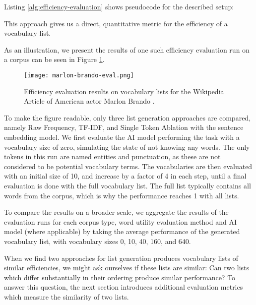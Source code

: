 Listing \ref{alg:efficiency-evaluation} shows pseudocode for the described setup:




This approach gives us a direct, quantitative metric for the efficiency of a vocabulary list.

As an illustration, we present the results of one such efficiency evaluation run on a corpus can be seen in Figure \ref{fig:marlon-brando-eval}.
\begin{figure}[H]
	\centering
	\texttt{[image: marlon-brando-eval.png]}
	\caption{Efficiency evaluation results on vocabulary lists for the Wikipedia Article of American actor Marlon Brando \protect\footnotemark.}
	\label{fig:marlon-brando-eval}
\end{figure}


To make the figure readable, only three list generation approaches are compared, namely Raw Frequency, TF-IDF, and Single Token Ablation with the sentence embedding model.
We first evaluate the AI model performing the task with a vocabulary size of zero, simulating the state of not knowing any words. 
The only tokens in this run are named entities and punctuation, as these are not considered to be potential vocabulary terms.
The vocabularies are then evaluated with an initial size of 10, and increase by a factor of 4 in each step, until a final evaluation is done with the full vocabulary list.
The full list typically contains all words from the corpus, which is why the performance reaches 1 with all lists.

To compare the results on a broader scale, we aggregate the results of the evaluation runs for each corpus type, word utility evaluation method and AI model (where applicable) by taking the average performance of the generated vocabulary list, with vocabulary sizes 0, 10, 40, 160, and 640.


When we find two approaches for list generation produces vocabulary lists of similar efficiencies, we might ask ourselves if these lists are similar:
Can two lists which differ substantially in their ordering produce similar performance?
To answer this question, the next section introduces additional evaluation metrics which measure the similarity of two lists.

